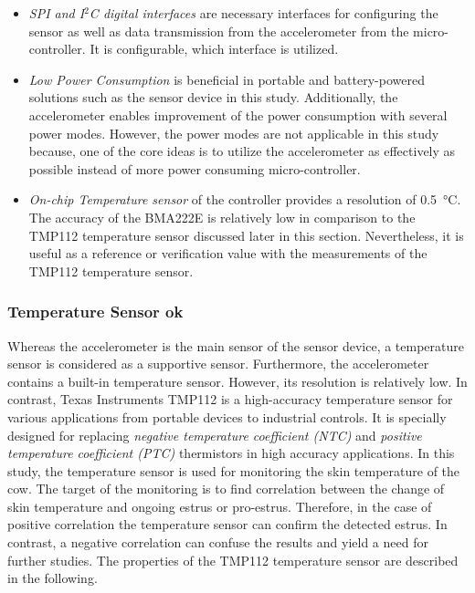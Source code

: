 \documentclass[english,12pt,a4paper,pdftex,elec,utf8]{aaltothesis}
\begin{document}
\begin{itemize}
\item \textit{SPI and I$^2$C digital interfaces} are necessary interfaces for configuring the sensor as well as data transmission from the accelerometer from the micro-controller. It is configurable, which interface is utilized.

\item \textit{Low Power Consumption} is beneficial in portable and battery-powered solutions such as the sensor device in this study. Additionally, the accelerometer enables improvement of the power consumption with several power modes. However, the power modes are not applicable in this study because, one of the core ideas is to utilize the accelerometer as effectively as possible instead of more  power consuming micro-controller.
 
\item \textit{On-chip Temperature sensor} of the controller provides a resolution of \SI{0.5}{\celsius}. The accuracy of the BMA222E is relatively low in comparison to the TMP112 temperature sensor discussed later in this section. Nevertheless, it is useful as a reference or verification value with the measurements of the TMP112 temperature sensor. \cite{bma222datasheet}

\end{itemize}



\subsubsection*{Temperature Sensor ok}

Whereas the accelerometer is the main sensor of the sensor device, a temperature sensor is considered as a supportive sensor. Furthermore, the accelerometer contains a built-in temperature sensor. However, its resolution is relatively low. In contrast, Texas Instruments TMP112 is a high-accuracy temperature sensor for various applications from portable devices to industrial controls.  It is specially designed for replacing \textit{negative temperature coefficient (NTC)} and \textit{positive temperature coefficient (PTC)} thermistors in high accuracy applications. In this study, the temperature sensor is used for monitoring the skin temperature of the cow. The target of the monitoring is to find correlation between the change of skin temperature and ongoing estrus or pro-estrus. Therefore, in the case of positive correlation the temperature sensor can confirm the detected estrus. In contrast, a negative correlation can confuse the results and yield a need for further studies. The properties of the TMP112 temperature sensor are described in the following.
\end{document}
